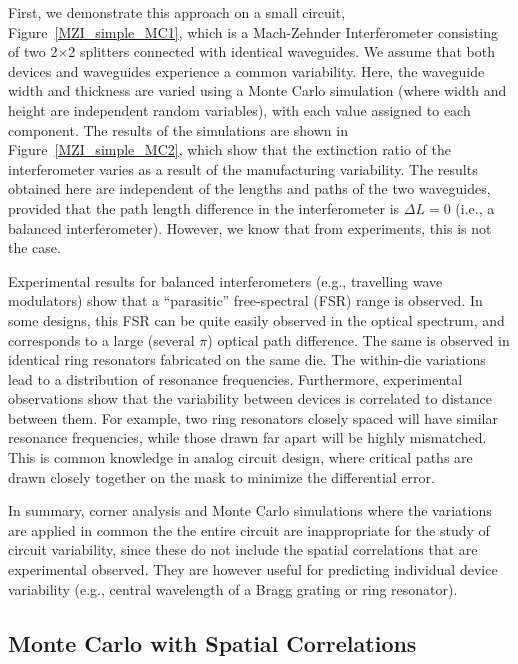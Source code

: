 \documentclass[journal]{spie}
\begin{document}
First, we demonstrate this approach on a small circuit, Figure~\ref{MZI_simple_MC1}, which is a Mach-Zehnder Interferometer consisting of two 2$\times$2 splitters connected with identical waveguides.  We assume that both devices and waveguides experience a common variability.  Here, the waveguide width and thickness are varied using a Monte Carlo simulation (where width and height are independent random variables), with each value assigned to each component.  The results of the simulations are shown in  Figure~\ref{MZI_simple_MC2}, which show that the extinction ratio of the interferometer varies as a result of the manufacturing variability.  The results obtained here are independent of the lengths and paths of the two waveguides, provided that the path length difference in the interferometer is $\Delta L = 0$ (i.e., a balanced interferometer). However, we know that from experiments, this is not the case.  

Experimental results for balanced interferometers (e.g., travelling wave modulators) show that a ``parasitic'' free-spectral (FSR) range is observed.  In some designs, this FSR can be quite easily observed in the optical spectrum, and corresponds to a large (several $\pi$) optical path difference.  The same is observed in identical ring resonators fabricated on the same die.  The within-die variations lead to a distribution of resonance frequencies.  Furthermore, experimental observations show that the variability between devices is correlated to distance between them.  For example, two ring resonators closely spaced will have similar resonance frequencies, while those drawn far apart will be highly mismatched.  This is common knowledge in analog circuit design, where critical paths are drawn closely together on the mask to minimize the differential error. 

In summary, corner analysis and Monte Carlo simulations where the variations are applied in common the the entire circuit are inappropriate for the study of circuit variability, since these do not include the spatial correlations that are experimental observed.  They are however useful for predicting individual device variability (e.g., central wavelength of a Bragg grating or ring resonator).


\subsection{Monte Carlo with Spatial Correlations}
\end{document}
